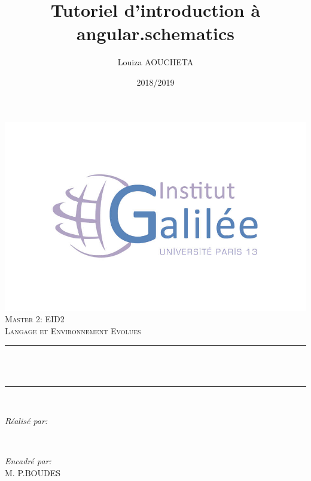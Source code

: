 \documentclass[12pt,french]{article}
\title{Tutoriel d'introduction à angular.schematics}
\author{Louiza AOUCHETA}
\date{2018/2019}
\makeatletter
\let\thetitle\@title
\let\theauthor\@author
\let\thedate\@date
\makeatother
\begin{document}

\begin{titlepage}
\centering 
\includegraphics[scale=0.25]{logo.jpg} \\
    \vspace*{0.5 cm}
    \textsc{\LARGE Master 2: EID2}\\[2.0 cm]	
	\textsc{\large Langage et Environnement Evolues}\\[0.5 cm]				%
	\rule{\linewidth}{0.2 mm} \\[0.4 cm]
	{ \huge \bfseries \thetitle}\\
	\rule{\linewidth}{0.2 mm} \\[1.5 cm]
	
	\begin{minipage}{0.4\textwidth}
		\begin{flushleft} \large
			\emph{Réalisé par:}\\
			\theauthor
			\end{flushleft}
			\end{minipage}~
			\begin{minipage}{0.4\textwidth}
			\begin{flushright} \large
			\emph{Encadré par:} \\
			M. P.BOUDES									%
		\end{flushright}
	\end{minipage}\\[2 cm]
	
	{\large \thedate}\\[2 cm]
 
	\vfill
	
\end{titlepage}
\end{document}

